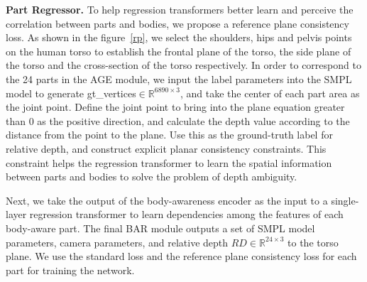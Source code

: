 \documentclass[10pt,twocolumn,letterpaper]{article}
\begin{document}
\noindent\textbf{Part Regressor.}
To help regression transformers better learn and perceive the correlation between parts and bodies, we propose a reference plane consistency loss. As shown in the figure~\ref{rp}, we select the shoulders, hips and pelvis points on the human torso to establish the frontal plane of the torso, the side plane of the torso and the cross-section of the torso respectively. In order to correspond to the 24 parts in the AGE module, we input the label parameters into the SMPL model to generate gt\_vertices$\in \mathbb{R}^{6890\times 3}$, and take the center of each part area as the joint point. Define the joint point to bring into the plane equation greater than 0 as the positive direction, and calculate the depth value according to the distance from the point to the plane. Use this as the ground-truth label for relative depth, and construct explicit planar consistency constraints. This constraint helps the regression transformer to learn the spatial information between parts and bodies to solve the problem of depth ambiguity.

Next, we take the output of the body-awareness encoder as the input to a single-layer regression transformer to learn dependencies among the features of each body-aware part. The final BAR module outputs a set of SMPL model parameters, camera parameters, and relative depth $RD\in \mathbb{R}^{24\times 3}$ to the torso plane. We use the standard loss and the reference plane consistency loss for each part for training the network. 
\end{document}
